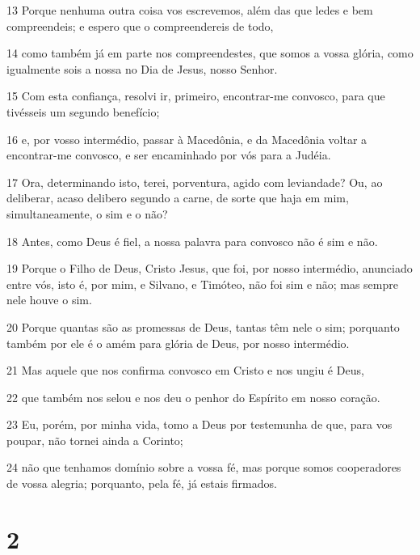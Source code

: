 \par 13 Porque nenhuma outra coisa vos escrevemos, além das que ledes e bem compreendeis; e espero que o compreendereis de todo,
\par 14 como também já em parte nos compreendestes, que somos a vossa glória, como igualmente sois a nossa no Dia de Jesus, nosso Senhor.
\par 15 Com esta confiança, resolvi ir, primeiro, encontrar-me convosco, para que tivésseis um segundo benefício;
\par 16 e, por vosso intermédio, passar à Macedônia, e da Macedônia voltar a encontrar-me convosco, e ser encaminhado por vós para a Judéia.
\par 17 Ora, determinando isto, terei, porventura, agido com leviandade? Ou, ao deliberar, acaso delibero segundo a carne, de sorte que haja em mim, simultaneamente, o sim e o não?
\par 18 Antes, como Deus é fiel, a nossa palavra para convosco não é sim e não.
\par 19 Porque o Filho de Deus, Cristo Jesus, que foi, por nosso intermédio, anunciado entre vós, isto é, por mim, e Silvano, e Timóteo, não foi sim e não; mas sempre nele houve o sim.
\par 20 Porque quantas são as promessas de Deus, tantas têm nele o sim; porquanto também por ele é o amém para glória de Deus, por nosso intermédio.
\par 21 Mas aquele que nos confirma convosco em Cristo e nos ungiu é Deus,
\par 22 que também nos selou e nos deu o penhor do Espírito em nosso coração.
\par 23 Eu, porém, por minha vida, tomo a Deus por testemunha de que, para vos poupar, não tornei ainda a Corinto;
\par 24 não que tenhamos domínio sobre a vossa fé, mas porque somos cooperadores de vossa alegria; porquanto, pela fé, já estais firmados.

\chapter{2}

